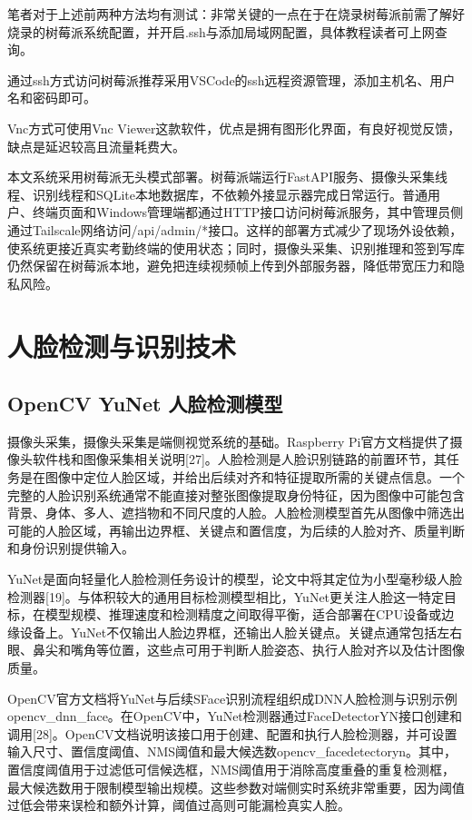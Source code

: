 \documentclass[UTF8]{heuthesis}
\begin{document}
笔者对于上述前两种方法均有测试：非常关键的一点在于在烧录树莓派前需了解好烧录的树莓派系统配置，并开启.ssh与添加局域网配置，具体教程读者可上网查询。

通过ssh方式访问树莓派推荐采用VSCode的ssh远程资源管理，添加主机名、用户名和密码即可。

Vnc方式可使用Vnc Viewer这款软件，优点是拥有图形化界面，有良好视觉反馈，缺点是延迟较高且流量耗费大。

本文系统采用树莓派无头模式部署。树莓派端运行FastAPI服务、摄像头采集线程、识别线程和SQLite本地数据库，不依赖外接显示器完成日常运行。普通用户、终端页面和Windows管理端都通过HTTP接口访问树莓派服务，其中管理员侧通过Tailscale网络访问/api/admin/*接口。这样的部署方式减少了现场外设依赖，使系统更接近真实考勤终端的使用状态；同时，摄像头采集、识别推理和签到写库仍然保留在树莓派本地，避免把连续视频帧上传到外部服务器，降低带宽压力和隐私风险。

\section{人脸检测与识别技术}
\subsection{OpenCV YuNet 人脸检测模型}
摄像头采集，摄像头采集是端侧视觉系统的基础。Raspberry Pi官方文档提供了摄像头软件栈和图像采集相关说明[27]。人脸检测是人脸识别链路的前置环节，其任务是在图像中定位人脸区域，并给出后续对齐和特征提取所需的关键点信息。一个完整的人脸识别系统通常不能直接对整张图像提取身份特征，因为图像中可能包含背景、身体、多人、遮挡物和不同尺度的人脸。人脸检测模型首先从图像中筛选出可能的人脸区域，再输出边界框、关键点和置信度，为后续的人脸对齐、质量判断和身份识别提供输入。

YuNet是面向轻量化人脸检测任务设计的模型，论文中将其定位为小型毫秒级人脸检测器[19]。与体积较大的通用目标检测模型相比，YuNet更关注人脸这一特定目标，在模型规模、推理速度和检测精度之间取得平衡，适合部署在CPU设备或边缘设备上。YuNet不仅输出人脸边界框，还输出人脸关键点。关键点通常包括左右眼、鼻尖和嘴角等位置，这些点可用于判断人脸姿态、执行人脸对齐以及估计图像质量。

OpenCV官方文档将YuNet与后续SFace识别流程组织成DNN人脸检测与识别示例opencv\_dnn\_face。在OpenCV中，YuNet检测器通过FaceDetectorYN接口创建和调用[28]。OpenCV文档说明该接口用于创建、配置和执行人脸检测器，并可设置输入尺寸、置信度阈值、NMS阈值和最大候选数opencv\_facedetectoryn。其中，置信度阈值用于过滤低可信候选框，NMS阈值用于消除高度重叠的重复检测框，最大候选数用于限制模型输出规模。这些参数对端侧实时系统非常重要，因为阈值过低会带来误检和额外计算，阈值过高则可能漏检真实人脸。
\end{document}
